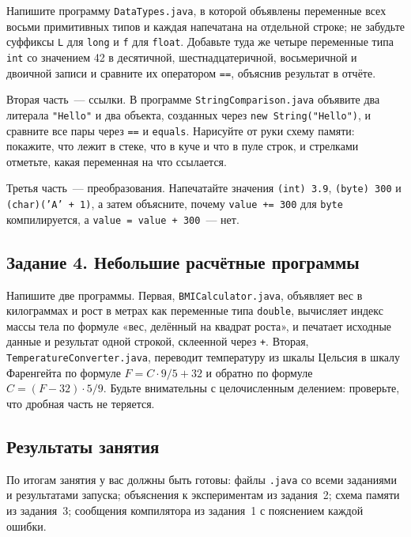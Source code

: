 Напишите программу \texttt{DataTypes.java}, в которой объявлены переменные всех
восьми примитивных типов и каждая напечатана на отдельной строке; не забудьте
суффиксы \texttt{L} для \texttt{long} и \texttt{f} для \texttt{float}.
Добавьте туда же четыре переменные типа \texttt{int} со значением 42
в десятичной, шестнадцатеричной, восьмеричной и двоичной записи и сравните их
оператором \texttt{==}, объяснив результат в отчёте.

Вторая часть~--- ссылки. В программе \texttt{StringComparison.java} объявите два
литерала \texttt{"Hello"} и два объекта, созданных через
\texttt{new String("Hello")}, и сравните все пары через \texttt{==} и
\texttt{equals}. Нарисуйте от руки схему памяти: покажите, что лежит в стеке, что
в куче и что в пуле строк, и стрелками отметьте, какая переменная на что
ссылается.

Третья часть~--- преобразования. Напечатайте значения \texttt{(int) 3.9},
\texttt{(byte) 300} и \texttt{(char)('A' + 1)}, а затем объясните, почему
\texttt{value += 300} для \texttt{byte} компилируется, а
\texttt{value = value + 300}~--- нет.

\subsection*{Задание 4. Небольшие расчётные программы}

Напишите две программы. Первая, \texttt{BMICalculator.java}, объявляет вес в
килограммах и рост в метрах как переменные типа \texttt{double}, вычисляет
индекс массы тела по формуле «вес, делённый на квадрат роста», и печатает
исходные данные и результат одной строкой, склеенной через \texttt{+}.
Вторая, \texttt{TemperatureConverter.java}, переводит температуру из шкалы
Цельсия в шкалу Фаренгейта по формуле $F = C \cdot 9 / 5 + 32$ и обратно по
формуле $C = (F - 32) \cdot 5 / 9$. Будьте внимательны с целочисленным делением:
проверьте, что дробная часть не теряется.

\subsection*{Результаты занятия}

По итогам занятия у вас должны быть готовы: файлы \texttt{.java} со всеми
заданиями и результатами запуска; объяснения к экспериментам из задания~2;
схема памяти из задания~3; сообщения компилятора из задания~1 с пояснением
каждой ошибки.

\kontrolvoprosy

